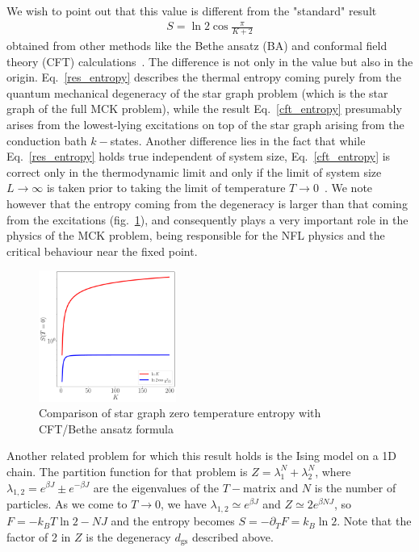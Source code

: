 \documentclass[12pt]{revtex4-2}
\begin{document}
We wish to point out that this value is different from the "standard" result 
\begin{align}
\label{cft_entropy}
S = \ln 2\cos \frac{\pi}{K+2}
\end{align}
obtained from other methods like the Bethe ansatz (BA) and conformal field theory (CFT) calculations~\cite{Gan_Andrei_Coleman_1993,andrei_destri_1984,Tsvelick_weigmann_mchannel_1985,sacramento1989,emery_kivelson,affleck_1991_overscreen}. The difference is not only in the value but also in the origin. Eq.~\ref{res_entropy} describes the thermal entropy coming purely from the quantum mechanical degeneracy of the star graph problem (which is the star graph of the full MCK problem), while the result Eq.~\ref{cft_entropy} presumably arises from the lowest-lying excitations on top of the star graph arising from the conduction bath \(k-\)states. Another difference lies in the fact that while Eq.~\ref{res_entropy} holds true independent of system size, Eq.~\ref{cft_entropy} is correct only in the thermodynamic limit and only if the limit of system size \(L \to \infty\) is taken prior to taking the limit of temperature \(T \to 0\)~\cite{Gan_Andrei_Coleman_1993,rozhkov_1998,vondelft_prl_1998}. We note however that the entropy coming from the degeneracy is larger than that coming from the excitations (fig.~\ref{entropy_comparison}), and consequently plays a very important role in the physics of the MCK problem, being responsible for the NFL physics and the critical behaviour near the fixed point.

\begin{figure}[!ht]
	\centering
	\includegraphics[width=0.4\textwidth]{../numerics/entropy_comparison.pdf}
	\caption{Comparison of star graph zero temperature entropy with CFT/Bethe ansatz formula}
	\label{entropy_comparison}
\end{figure}


Another related problem for which this result holds is the Ising model on a 1D chain. The partition function for that problem is \(Z = \lambda_1^N + \lambda_2^N\), where \(\lambda_{1,2} = e^{\beta J} \pm e^{-\beta J} \) are the eigenvalues of the \(T-\)matrix and \(N\) is the number of particles. As we come to \(T \to 0\), we have \(\lambda_{1,2} \simeq e^{\beta J}\) and \(Z \simeq 2 e^{\beta N J}\), so \(F = -k_B T \ln 2 - N J\) and the entropy becomes \(S = - \partial_T F = k_B \ln 2\). Note that the factor of 2 in \(Z\) is the degeneracy \(d_\text{gs}\) described above.
\end{document}
